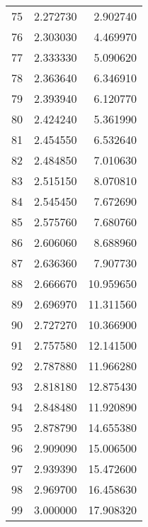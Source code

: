 \begin{tabular}{lrr}
75 & 2.272730 & 2.902740 \\
76 & 2.303030 & 4.469970 \\
77 & 2.333330 & 5.090620 \\
78 & 2.363640 & 6.346910 \\
79 & 2.393940 & 6.120770 \\
80 & 2.424240 & 5.361990 \\
81 & 2.454550 & 6.532640 \\
82 & 2.484850 & 7.010630 \\
83 & 2.515150 & 8.070810 \\
84 & 2.545450 & 7.672690 \\
85 & 2.575760 & 7.680760 \\
86 & 2.606060 & 8.688960 \\
87 & 2.636360 & 7.907730 \\
88 & 2.666670 & 10.959650 \\
89 & 2.696970 & 11.311560 \\
90 & 2.727270 & 10.366900 \\
91 & 2.757580 & 12.141500 \\
92 & 2.787880 & 11.966280 \\
93 & 2.818180 & 12.875430 \\
94 & 2.848480 & 11.920890 \\
95 & 2.878790 & 14.655380 \\
96 & 2.909090 & 15.006500 \\
97 & 2.939390 & 15.472600 \\
98 & 2.969700 & 16.458630 \\
99 & 3.000000 & 17.908320 \\
\bottomrule
\end{tabular}
